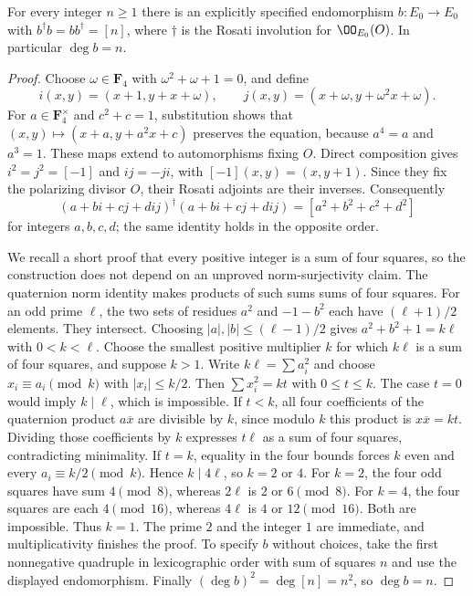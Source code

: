 \begin{lemma}
\label{lem:DE-A3-ss-norm}
For every integer $n\ge1$ there is an explicitly specified endomorphism
$b:E_0\to E_0$ with
$b^\dagger b=bb^\dagger=[n]$, where $\dagger$ is the Rosati involution for
$\OO_{E_0}(O)$.  In particular $\deg b=n$.
\end{lemma}
\begin{proof}
Choose $\omega\in\mathbf F_4$ with $\omega^2+\omega+1=0$, and define
\[
 i(x,y)=(x+1,y+x+\omega),\qquad
 j(x,y)=(x+\omega,y+\omega^2x+\omega).
\]
For $a\in\mathbf F_4^\times$ and $c^2+c=1$, substitution shows that
$(x,y)\mapsto(x+a,y+a^2x+c)$ preserves the equation, because $a^4=a$ and
$a^3=1$.  These maps extend to automorphisms fixing $O$.  Direct composition
gives $i^2=j^2=[-1]$ and $ij=-ji$, with $[-1](x,y)=(x,y+1)$.
Since they fix the polarizing divisor $O$, their Rosati adjoints are their
inverses.  Consequently
\[
 (a+bi+cj+dij)^\dagger(a+bi+cj+dij)
 =[a^2+b^2+c^2+d^2]
\]
for integers $a,b,c,d$; the same identity holds in the opposite order.

We recall a short proof that every positive integer is a sum of four squares,
so the construction does not depend on an unproved norm-surjectivity claim.
The quaternion norm identity makes products of such sums sums of four
squares.  For an odd prime $\ell$, the two sets of residues $a^2$ and
$-1-b^2$ each have $(\ell+1)/2$ elements.  They intersect.  Choosing
$|a|,|b|\le(\ell-1)/2$ gives
$a^2+b^2+1=k\ell$ with $0<k<\ell$.
Choose the smallest positive multiplier $k$ for which $k\ell$ is a sum of
four squares, and suppose $k>1$.  Write $k\ell=\sum a_i^2$ and choose
$x_i\equiv a_i\pmod k$ with $|x_i|\le k/2$.  Then
$\sum x_i^2=kt$ with $0\le t\le k$.  The case $t=0$ would imply
$k\mid\ell$, which is impossible.  If $t<k$, all four coefficients of the
quaternion product $a\overline x$ are divisible by $k$, since modulo $k$
this product is $x\overline x=kt$.  Dividing those coefficients by $k$
expresses $t\ell$ as a sum of four squares, contradicting minimality.
If $t=k$, equality in the four bounds forces $k$ even and every
$a_i\equiv k/2\pmod k$.  Hence $k\mid4\ell$, so $k=2$ or $4$.
For $k=2$, the four odd squares have sum $4\pmod8$, whereas $2\ell$ is
$2$ or $6\pmod8$.  For $k=4$, the four squares are each $4\pmod{16}$,
whereas $4\ell$ is $4$ or $12\pmod{16}$.  Both are impossible.  Thus
$k=1$.  The prime $2$ and the integer $1$ are immediate, and multiplicativity
finishes the proof.  To specify $b$ without choices, take the first
nonnegative quadruple in lexicographic order with sum of squares $n$ and
use the displayed endomorphism.  Finally
$(\deg b)^2=\deg[n]=n^2$, so $\deg b=n$.
\end{proof}

